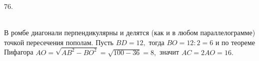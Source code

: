 76. \begin{figure}[ht!]
\end{figure}\\
В ромбе диагонали перпендикулярны и делятся (как и в любом параллелограмме) точкой пересечения пополам. Пусть $BD=12,$ тогда $BO=12:2=6$ и по теореме Пифагора $AO=\sqrt{AB^2-BO^2}=\sqrt{100-36}=8,$ значит $AC=2AO=16.$\\
